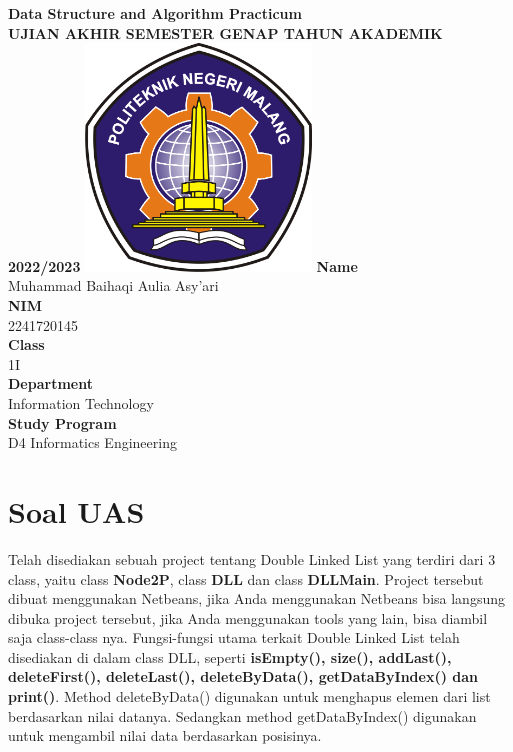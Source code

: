 \documentclass[12pt,titlepage]{article}
\newcommand{\vSubject}{Data Structure and Algorithm Practicum}
\newcommand{\vSubtitle}{UJIAN AKHIR SEMESTER GENAP TAHUN AKADEMIK 2022/2023}
\newcommand{\vName}{Muhammad Baihaqi Aulia Asy'ari}
\newcommand{\vNIM}{2241720145}
\newcommand{\vClass}{1I}
\newcommand{\vDepartment}{Information Technology}
\newcommand{\vStudyProgram}{D4 Informatics Engineering}
\begin{document}
\begin{titlepage}
    \centering
    \vfill
    {\bfseries\LARGE
        \vSubject\\
        \vskip0.25cm
        \vSubtitle
    }
    \vfill
    \includegraphics[width=6cm]{images/polinema-logo.png}
    \vfill
    {
        \textbf{Name}\\
        \vName\\
        \vskip0.5cm
        \textbf{NIM}\\
        \vNIM\\
        \vskip0.5cm
        \textbf{Class}\\
        \vClass\\
        \vskip0.5cm
        \textbf{Department}\\
        \vDepartment\\
        \vskip0.5cm
        \textbf{Study Program}\\
        \vStudyProgram
    }
\end{titlepage}

\newpage

\section*{Soal UAS}
Telah disediakan sebuah project tentang Double Linked List yang terdiri dari 3 class, yaitu class \textbf{Node2P}, class \textbf{DLL} dan class \textbf{DLLMain}. Project tersebut dibuat menggunakan Netbeans, jika Anda menggunakan Netbeans bisa langsung dibuka project tersebut, jika Anda menggunakan tools yang lain, bisa diambil saja class-class nya. Fungsi-fungsi utama terkait Double Linked List telah disediakan di dalam class DLL, seperti \textbf{isEmpty(), size(), addLast(), deleteFirst(), deleteLast(), deleteByData(), getDataByIndex() dan print()}. Method deleteByData() digunakan untuk menghapus elemen dari list berdasarkan nilai datanya. Sedangkan method getDataByIndex() digunakan untuk mengambil nilai data berdasarkan posisinya.
\end{document}
